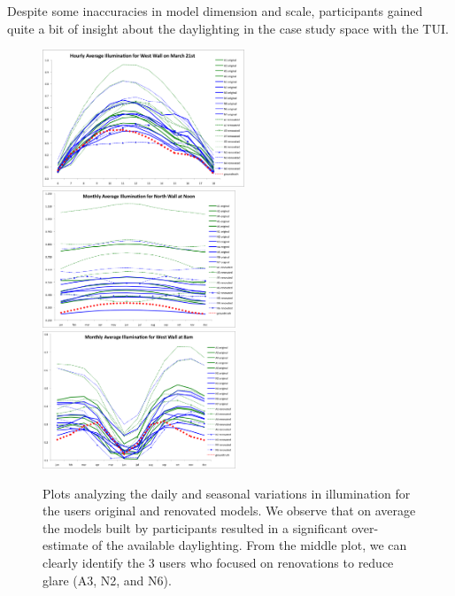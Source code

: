\documentclass{article}
\begin{document}
%
Despite some inaccuracies in model dimension and scale, participants
gained quite a bit of insight about the daylighting in the case study
space with the TUI. 








\begin{figure}[t]
\includegraphics[height=1.61in]{hourly_west_march_21.png}
\includegraphics[height=1.61in]{montly_average_north_wall_noon.png}
\includegraphics[height=1.61in]{monthly_average_west_wall_8am.png}
\caption{
%
Plots analyzing the daily and seasonal variations in
illumination for the users original and renovated models.  We observe
that on average the models built by participants resulted in a
significant over-estimate of the available daylighting.  From the
middle plot, we can clearly identify the 3 users who focused on
renovations to reduce glare (A3, N2, and N6).
%
}
\label{figure:plots}
\vspace{-0.1in}
\end{figure}
\end{document}
